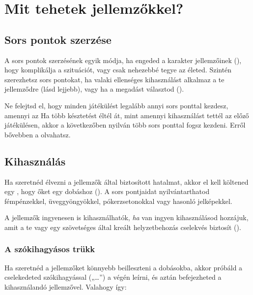 \section{Mit tehetek jellemzőkkel?}

\subsection{Sors pontok szerzése}

A sors pontok szerzésének egyik módja, ha engeded a karakter jellemzőinek  (), hogy komplikálja a szituációt, vagy csak nehezebbé tegye az életed. Szintén szerezhetsz sors pontokat, ha valaki ellenséges kihasználást alkalmaz a te jellemződre (lásd lejjebb), vagy ha a megadást választod ().

Ne felejtsd el, hogy minden játékülést legalább annyi sors ponttal kezdesz, amennyi az  Ha több késztetést éltél át, mint amennyi kihasználást tettél az előző játékülésen, akkor a következőben nyilván több sors ponttal fogsz kezdeni. Erről bővebben a  olvahatsz.

\subsection{Kihasználás}

Ha szeretnéd élvezni a jellemzők által biztosított hatalmat, akkor el kell költened egy , hogy  őket egy dobáshoz (). A sors pontjaidat nyilvántarthatod fémpénzekkel, üveggyöngyökkel, pókerzsetonokkal vagy hasonló jelképekkel.

A jellemzők ingyenesen is kihasználhatók, \emph{ha} van ingyen kihasználásod hozzájuk, amit a te vagy egy szövetséges által kreált helyzetbehozás cselekvés biztosít ().

\subsubsection{A szókihagyásos trükk}

Ha szeretnéd a jellemzőket könnyebb beilleszteni a dobásokba, akkor próbáld a cselekedeted szókihagyással („…”) a végén leírni, és aztán befejezheted a kihasználandó jellemzővel. Valahogy így:


